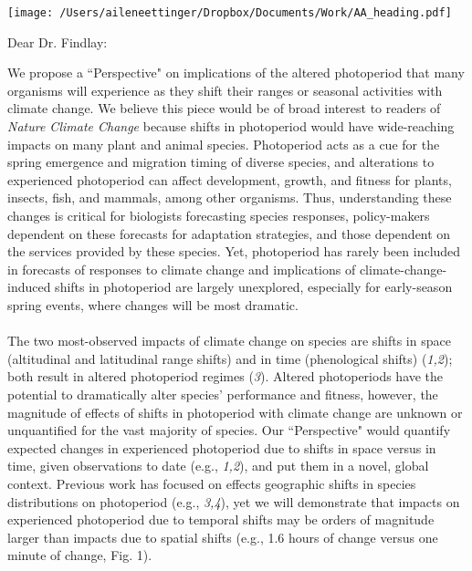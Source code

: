 \documentclass[10.7pt,a4paper]{letter}
\begin{document}

\begin{letter}{}
\texttt{[image: /Users/aileneettinger/Dropbox/Documents/Work/AA\_heading.pdf]}

\opening{Dear Dr. Findlay:}
We propose a ``Perspective" on implications of the altered photoperiod that many organisms will experience as they shift their ranges or seasonal activities with climate change. We believe this piece would be of broad interest to readers of \emph{Nature Climate Change} because shifts in photoperiod would have wide-reaching impacts on many plant and animal species. Photoperiod acts as a cue for the spring emergence and migration timing of diverse species, and alterations to experienced photoperiod can affect development, growth, and fitness for plants, insects, fish, and mammals, among other organisms. Thus, understanding these changes is critical for biologists forecasting species responses, policy-makers dependent on these forecasts for adaptation strategies, and those dependent on the services provided by these species. Yet, photoperiod has rarely been included in forecasts of responses to climate change and implications of climate-change-induced shifts in photoperiod are largely unexplored, especially for early-season spring events, where changes will be most dramatic. 
\\
\\
The two most-observed impacts of climate change on species are shifts in space (altitudinal and latitudinal range shifts) and in time (phenological shifts) (\emph{1,2}); both result in altered photoperiod regimes (\emph{3}).  Altered photoperiods have the potential to dramatically alter species' performance and fitness, however, the magnitude of effects of shifts in photoperiod with climate change are unknown or unquantified for the vast majority of species.  Our ``Perspective" would quantify expected changes in experienced photoperiod due to shifts in space versus in time, given observations to date (e.g., \emph{1,2}), and put them in a novel, global context. Previous work has focused on effects geographic shifts in species distributions on photoperiod (e.g., \emph{3,4}), yet we will demonstrate that impacts on experienced photoperiod due to temporal shifts may be orders of magnitude larger than impacts due to spatial shifts (e.g., 1.6 hours of change versus one minute of change, Fig. 1). 
\\
\\

\end{letter}
\end{document}
